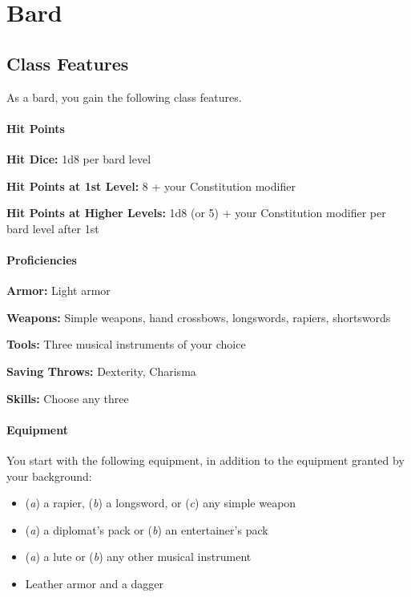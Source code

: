 \hypertarget{bard}{%
\section{Bard}\label{bard}}

\hypertarget{class-features}{%
\subsection{Class Features}\label{class-features}}

As a bard, you gain the following class features.

\hypertarget{hit-points}{%
\paragraph{Hit Points}\label{hit-points}}

\textbf{Hit Dice:} 1d8 per bard level

\textbf{Hit Points at 1st Level:} 8 + your Constitution modifier

\textbf{Hit Points at Higher Levels:} 1d8 (or 5) + your Constitution
modifier per bard level after 1st

\hypertarget{proficiencies}{%
\paragraph{Proficiencies}\label{proficiencies}}

\textbf{Armor:} Light armor

\textbf{Weapons:} Simple weapons, hand crossbows, longswords, rapiers,
shortswords

\textbf{Tools:} Three musical instruments of your choice

\textbf{Saving Throws:} Dexterity, Charisma

\textbf{Skills:} Choose any three

\hypertarget{equipment}{%
\paragraph{Equipment}\label{equipment}}

You start with the following equipment, in addition to the equipment
granted by your background:

\begin{itemize}
\tightlist
\item
  (\emph{a}) a rapier, (\emph{b}) a longsword, or (\emph{c}) any simple
  weapon
\item
  (\emph{a}) a diplomat's pack or (\emph{b}) an entertainer's pack
\item
  (\emph{a}) a lute or (\emph{b}) any other musical instrument
\item
  Leather armor and a dagger
\end{itemize}

